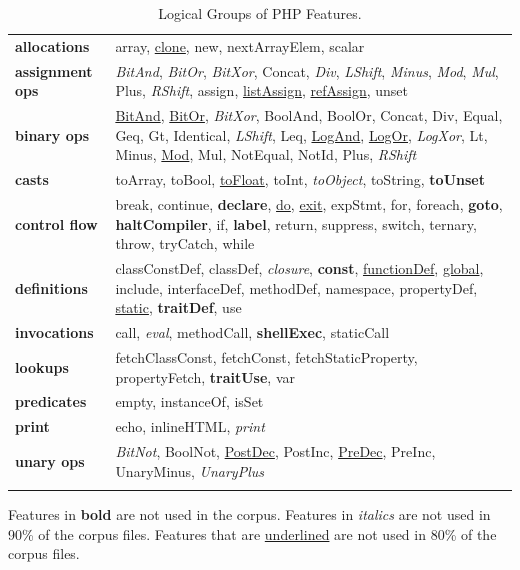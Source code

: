 \documentclass[main.tex]{subfiles}
\begin{document}

\begin{table}
\begin{tabularx}{\columnwidth}{lX}
\textbf{allocations} & array, \underline{clone}, new, nextArrayElem, scalar \\
\textbf{assignment ops} & \textit{BitAnd}, \textit{BitOr}, \textit{BitXor}, Concat, \textit{Div}, \textit{LShift}, \textit{Minus}, \textit{Mod}, \textit{Mul}, Plus, \textit{RShift}, assign, \underline{listAssign}, \underline{refAssign}, unset \\
\textbf{binary ops} & \underline{BitAnd}, \underline{BitOr}, \textit{BitXor}, BoolAnd, BoolOr, Concat, Div, Equal, Geq, Gt, Identical, \textit{LShift}, Leq, \underline{LogAnd}, \underline{LogOr}, \textit{LogXor}, Lt, Minus, \underline{Mod}, Mul, NotEqual, NotId, Plus, \textit{RShift} \\
\textbf{casts} & toArray, toBool, \underline{toFloat}, toInt, \textit{toObject}, toString, \textbf{toUnset} \\
\textbf{control flow} & break, continue, \textbf{declare}, \underline{do}, \underline{exit}, expStmt, for, foreach, \textbf{goto}, \textbf{haltCompiler}, if, \textbf{label}, return, suppress, switch, ternary, throw, tryCatch, while \\
\textbf{definitions} & classConstDef, classDef, \textit{closure}, \textbf{const}, \underline{functionDef}, \underline{global}, include, interfaceDef, methodDef, namespace, propertyDef, \underline{static}, \textbf{traitDef}, use \\
\textbf{invocations} & call, \textit{eval}, methodCall, \textbf{shellExec}, staticCall \\
\textbf{lookups} & fetchClassConst, fetchConst, fetchStaticProperty, propertyFetch, \textbf{traitUse}, var \\
\textbf{predicates} & empty, instanceOf, isSet \\
\textbf{print} & echo, inlineHTML, \textit{print} \\
\textbf{unary ops} & \textit{BitNot}, BoolNot, \underline{PostDec}, PostInc, \underline{PreDec}, PreInc, UnaryMinus, \textit{UnaryPlus} \\
 & \\ \end{tabularx}
\parbox{\columnwidth}{Features in \textbf{bold} are not used in the corpus. Features in \textit{italics} are not used in 90\% of the corpus files. Features that are \underline{underlined} are not used in 80\% of the corpus files.}
\ \vspace{1ex}
\caption{Logical Groups of PHP Features.\label{Table:FeatureGroups}}
\end{table}
\end{document}
